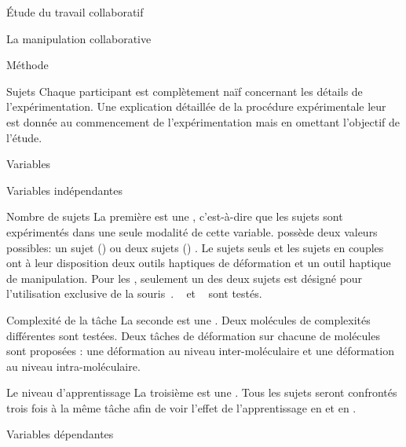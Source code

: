 \documentclass[myfrancais]{mythesis}
\begin{document}
\begin{mypart}{Étude du travail collaboratif}
\begin{mychapter}{La manipulation collaborative}
\begin{mysection}{Méthode}
\begin{mysubsection}{Sujets}
					Chaque participant est complètement naïf concernant les détails de l'expérimentation.
					Une explication détaillée de la procédure expérimentale leur est donnée au commencement de l'expérimentation mais en omettant l'objectif de l'étude.
				\end{mysubsection}
				\begin{mysubsection}{Variables}
					\begin{mysubsubsection}{Variables indépendantes}
						\begin{myparagraph}{ Nombre de sujets}
							La première  est une , c'est-à-dire que les sujets sont expérimentés dans une seule modalité de cette variable.
							 possède deux valeurs possibles: \og un sujet (\mycf {}) \fg ou \og deux sujets (\mycf {}) \fg.
							Le sujets seuls et les sujets en couples ont à leur disposition deux outils haptiques de déformation et un outil haptique de manipulation.
							Pour les , seulement un des deux sujets est désigné pour l'utilisation exclusive de la souris~\myThreeD.
							\mynum{12}~ et ~ sont testés.
						\end{myparagraph}
						\begin{myparagraph}{ Complexité de la tâche}
							La seconde  est une .
							Deux molécules de complexités différentes sont testées.
							Deux tâches de déformation sur chacune de molécules sont proposées : une déformation au niveau inter-moléculaire et une déformation au niveau intra-moléculaire.
						\end{myparagraph}
						\begin{myparagraph}{ Le niveau d'apprentissage}
							La troisième  est une .
							Tous les sujets seront confrontés trois fois à la même tâche afin de voir l'effet de l'apprentissage en  et en .
						\end{myparagraph}
					\end{mysubsubsection}
					\begin{mysubsubsection}{Variables dépendantes}

\end{mysubsubsection}
\end{mysubsection}
\end{mysection}
\end{mychapter}
\end{mypart}
\end{document}
